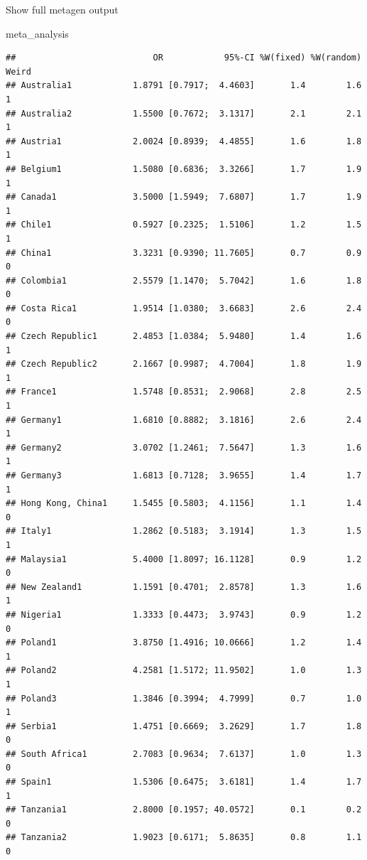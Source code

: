 \documentclass[
]{book}
\newenvironment{Shaded}{\begin{snugshade}}{\end{snugshade}}
\newcommand{\NormalTok}[1]{#1}
\begin{document}
Show full metagen output

\begin{Shaded}
\begin{Highlighting}[]
\NormalTok{meta_analysis}
\end{Highlighting}
\end{Shaded}

\begin{verbatim}
##                           OR            95%-CI %W(fixed) %W(random) Weird
## Australia1            1.8791 [0.7917;  4.4603]       1.4        1.6     1
## Australia2            1.5500 [0.7672;  3.1317]       2.1        2.1     1
## Austria1              2.0024 [0.8939;  4.4855]       1.6        1.8     1
## Belgium1              1.5080 [0.6836;  3.3266]       1.7        1.9     1
## Canada1               3.5000 [1.5949;  7.6807]       1.7        1.9     1
## Chile1                0.5927 [0.2325;  1.5106]       1.2        1.5     1
## China1                3.3231 [0.9390; 11.7605]       0.7        0.9     0
## Colombia1             2.5579 [1.1470;  5.7042]       1.6        1.8     0
## Costa Rica1           1.9514 [1.0380;  3.6683]       2.6        2.4     0
## Czech Republic1       2.4853 [1.0384;  5.9480]       1.4        1.6     1
## Czech Republic2       2.1667 [0.9987;  4.7004]       1.8        1.9     1
## France1               1.5748 [0.8531;  2.9068]       2.8        2.5     1
## Germany1              1.6810 [0.8882;  3.1816]       2.6        2.4     1
## Germany2              3.0702 [1.2461;  7.5647]       1.3        1.6     1
## Germany3              1.6813 [0.7128;  3.9655]       1.4        1.7     1
## Hong Kong, China1     1.5455 [0.5803;  4.1156]       1.1        1.4     0
## Italy1                1.2862 [0.5183;  3.1914]       1.3        1.5     1
## Malaysia1             5.4000 [1.8097; 16.1128]       0.9        1.2     0
## New Zealand1          1.1591 [0.4701;  2.8578]       1.3        1.6     1
## Nigeria1              1.3333 [0.4473;  3.9743]       0.9        1.2     0
## Poland1               3.8750 [1.4916; 10.0666]       1.2        1.4     1
## Poland2               4.2581 [1.5172; 11.9502]       1.0        1.3     1
## Poland3               1.3846 [0.3994;  4.7999]       0.7        1.0     1
## Serbia1               1.4751 [0.6669;  3.2629]       1.7        1.8     0
## South Africa1         2.7083 [0.9634;  7.6137]       1.0        1.3     0
## Spain1                1.5306 [0.6475;  3.6181]       1.4        1.7     1
## Tanzania1             2.8000 [0.1957; 40.0572]       0.1        0.2     0
## Tanzania2             1.9023 [0.6171;  5.8635]       0.8        1.1     0

\end{verbatim}
\end{document}
